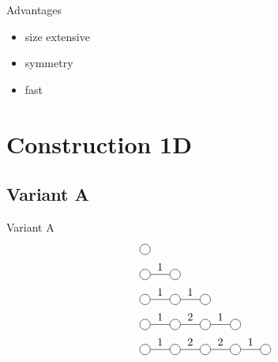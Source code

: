 \documentclass[aspectratio=169]{beamer}
\begin{document}
\begin{frame}{Advantages}
    \begin{itemize}
        \item size extensive
        \item symmetry
        \item fast
    \end{itemize}
\end{frame}


\section{Construction 1D}

\subsection{Variant A}

\begin{frame}{Variant A}
    \begin{equation}
        \begin{split}
            &\mpob{1}{ {,}  }{}{}{}{{,,}} \\
            &\mpob{2}{ {,"1",}  }{}{}{}{{,,}}\\
            &\mpob{3}{ {,"1","1",}  }{}{}{}{{,,,}}\\
            &\mpob{4}{ {,"1","2","1",}  }{}{}{}{{,,,,,}}\\
            &\mpob{5}{ {,"1","2","2","1",}  }{}{}{}{{,,,,,}}\\
        \end{split}
    \end{equation}

\end{frame}



\end{document}
